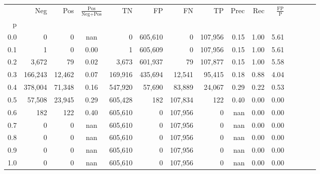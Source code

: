 \begin{tabular}{rrrcrrrrrrrrrrr}
\toprule
{} &      Neg &     Pos & $\frac{\text{Pos}}{\text{Neg}+\text{Pos}}$ &       TN &       FP &       FN &       TP &  Prec &   Rec & $\frac{\text{FP}}{\text{P}}$ \\
p   &          &         &                                            &          &          &          &          &       &       &                              \\
\midrule
0.0 &        0 &       0 &                                        nan &        0 &  605,610 &        0 &  107,956 &  0.15 &  1.00 &                         5.61 \\
0.1 &        1 &       0 &                                       0.00 &        1 &  605,609 &        0 &  107,956 &  0.15 &  1.00 &                         5.61 \\
0.2 &    3,672 &      79 &                                       0.02 &    3,673 &  601,937 &       79 &  107,877 &  0.15 &  1.00 &                         5.58 \\
0.3 &  166,243 &  12,462 &                                       0.07 &  169,916 &  435,694 &   12,541 &   95,415 &  0.18 &  0.88 &                         4.04 \\
0.4 &  378,004 &  71,348 &                                       0.16 &  547,920 &   57,690 &   83,889 &   24,067 &  0.29 &  0.22 &                         0.53 \\
0.5 &   57,508 &  23,945 &                                       0.29 &  605,428 &      182 &  107,834 &      122 &  0.40 &  0.00 &                         0.00 \\
0.6 &      182 &     122 &                                       0.40 &  605,610 &        0 &  107,956 &        0 &   nan &  0.00 &                         0.00 \\
0.7 &        0 &       0 &                                        nan &  605,610 &        0 &  107,956 &        0 &   nan &  0.00 &                         0.00 \\
0.8 &        0 &       0 &                                        nan &  605,610 &        0 &  107,956 &        0 &   nan &  0.00 &                         0.00 \\
0.9 &        0 &       0 &                                        nan &  605,610 &        0 &  107,956 &        0 &   nan &  0.00 &                         0.00 \\
1.0 &        0 &       0 &                                        nan &  605,610 &        0 &  107,956 &        0 &   nan &  0.00 &                         0.00 \\
\bottomrule
\end{tabular}
